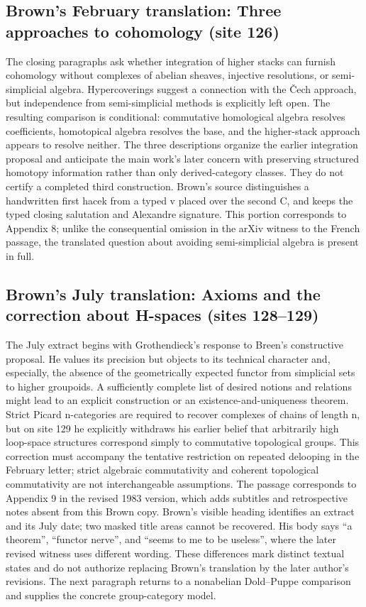 \subsection*{Brown's February translation: Three approaches to cohomology (site 126)}
The closing paragraphs ask whether integration of higher stacks can furnish cohomology without complexes of abelian sheaves, injective resolutions, or semi-simplicial algebra. Hypercoverings suggest a connection with the Čech approach, but independence from semi-simplicial methods is explicitly left open. The resulting comparison is conditional: commutative homological algebra resolves coefficients, homotopical algebra resolves the base, and the higher-stack approach appears to resolve neither. The three descriptions organize the earlier integration proposal and anticipate the main work's later concern with preserving structured homotopy information rather than only derived-category classes. They do not certify a completed third construction. Brown's source distinguishes a handwritten first hacek from a typed v placed over the second C, and keeps the typed closing salutation and Alexandre signature. This portion corresponds to Appendix 8; unlike the consequential omission in the arXiv witness to the French passage, the translated question about avoiding semi-simplicial algebra is present in full.

\subsection*{Brown's July translation: Axioms and the correction about H-spaces (sites 128--129)}
The July extract begins with Grothendieck's response to Breen's constructive proposal. He values its precision but objects to its technical character and, especially, the absence of the geometrically expected functor from simplicial sets to higher groupoids. A sufficiently complete list of desired notions and relations might lead to an explicit construction or an existence-and-uniqueness theorem. Strict Picard n-categories are required to recover complexes of chains of length n, but on site 129 he explicitly withdraws his earlier belief that arbitrarily high loop-space structures correspond simply to commutative topological groups. This correction must accompany the tentative restriction on repeated delooping in the February letter; strict algebraic commutativity and coherent topological commutativity are not interchangeable assumptions. The passage corresponds to Appendix 9 in the revised 1983 version, which adds subtitles and retrospective notes absent from this Brown copy. Brown's visible heading identifies an extract and its July date; two masked title areas cannot be recovered. His body says ``a theorem'', ``functor nerve'', and ``seems to me to be useless'', where the later revised witness uses different wording. These differences mark distinct textual states and do not authorize replacing Brown's translation by the later author's revisions. The next paragraph returns to a nonabelian Dold--Puppe comparison and supplies the concrete group-category model.

